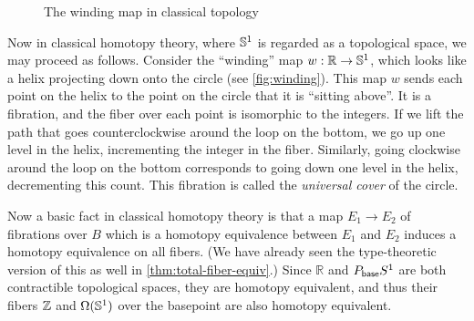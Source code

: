\begin{figure}\centering
  \caption{The winding map in classical topology}\label{fig:winding}
\end{figure}

Now in classical homotopy theory, where $\mathbb{S}^1$ is regarded as a topological space, we may proceed as follows.
Consider the ``winding'' map $w:\mathbb{R}\to \mathbb{S} ^1$, which looks like a helix projecting down onto the circle (see \autoref{fig:winding}).
This map $w$ sends each point on the helix to the point on the circle that it is ``sitting above''.
It is a fibration, and the fiber over each point is isomorphic to the integers.
If we lift the path that goes counterclockwise around the loop on the bottom, we go up one level in the helix, incrementing the integer in the fiber.
Similarly, going clockwise around the loop on the bottom corresponds to going down one level in the helix, decrementing this count.
This fibration is called the \emph{universal cover} of the circle.

Now a basic fact in classical homotopy theory is that a map $E_1\to E_2$ of fibrations over $B$ which is a homotopy equivalence between $E_1$ and $E_2$ induces a homotopy equivalence on all fibers.
(We have already seen the type-theoretic version of this as well in \autoref{thm:total-fiber-equiv}.)
Since $\mathbb{R}$ and $P_{\mathsf{base}} S^1$ are both contractible topological spaces, they are homotopy equivalent, and thus their fibers $\mathbb{Z}$ and $\Omega(\mathbb{S} ^1)$ over the basepoint are also homotopy equivalent.

